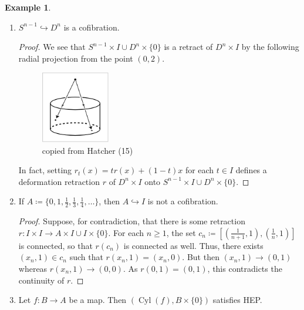 \documentclass[10pt,letterpaper,cm]{nupset}
\theoremstyle{definition}
\newtheorem{exmp}[definition]{Example}
\theoremstyle{theorem}
\theoremstyle{remark}
\newcommand{\1}{\mathbb{1}}
\newcommand{\0}{\vec 0}
\DeclareMathOperator{\cyl}{Cyl}
\begin{document}
\begin{exmp}\label{ex12} $ $
\begin{enumerate}[label=(\alph*)]
\item $S^{n-1} \hookrightarrow D^n$ is a cofibration. 
\begin{proof}
We see that $S^{n-1} \times I \cup D^n \times \{0\}$ is a retract of $D^n \times I$ by the following radial projection from the point $(0,2)$.
\begin{figure}[H]
\centering
\includegraphics[width=30mm]{Hatcher-radial_proj.png}
\caption{copied from Hatcher (15) \label{overflow}}
\end{figure} In fact, setting $r_t(x) = tr(x) +(1-t)x$ for each $t\in I$ defines a deformation retraction $r$ of $D^n \times I$ onto $S^{n-1} \times I \cup D^n \times \{0\}$.
\end{proof}
\item If $A\coloneqq  \{0, 1, \frac{1}{2}, \frac{1}{3}, \frac{1}{4}, \ldots\}$, then $A \hookrightarrow I$ is not a cofibration.
\begin{proof}
Suppose, for contradiction, that there is some retraction $r: I \times I \to A \times I \cup I \times \{0\}$. For each $n\geq 1$, the set $c_n \coloneqq  [(\frac{1}{n+1}, 1), (\frac{1}{n}, 1)]$ is connected, so that $r(c_n)$ is connected as well. Thus, there exists $(x_n, 1) \in c_n$ such that $r(x_n, 1) = (x_n ,0)$. But then $(x_n, 1) \to (0, 1)$ whereas $r(x_n, 1) \to (0, 0)$. As $r(0,1) = (0,1)$, this contradicts the continuity of $r$. 
\end{proof}
\item Let $f: B \to A$ be a map. Then $(\cyl(f), B \times \{0\})$ satisfies HEP.
\end{enumerate}
\end{exmp}
\end{document}
